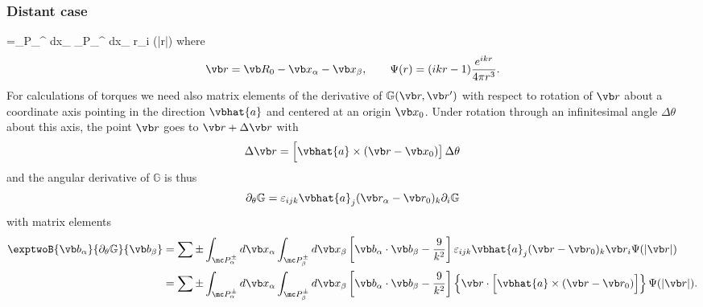 \documentclass[letterpaper]{article}
\begin{document}
\subsubsection*{Distant case}
{
 =\sum \pm \int_{\mc P_\alpha^\pm } d\vb x_\alpha
           \int_{\mc P_\beta^\pm  } d\vb x_\beta
           r_i \Psi(|\vb r|)
}
where
$$ \vb r = \vb R_0 - \vb x_\alpha - \vb x_\beta, \qquad
   \Psi(r) = (ikr-1)\frac{e^{ikr}}{4\pi r^3}.
$$
For calculations of torques we need also matrix elements
of the derivative of $\mathbb{G}(\vb r, \vb r^\prime)$ with respect
to rotation of $\vb r$ about a coordinate axis pointing in the 
direction $\vbhat{a}$ and centered at an origin $\vb x_0$. 
Under rotation through an infinitesimal angle $\Delta \theta$
about this axis, the point $\vb r$ goes to $\vb r + \Delta \vb r$
with 
$$\Delta \vb r = \Big[\vbhat{a}\times (\vb r-\vb x_0)\big] \, \Delta \theta$$
and the angular derivative of $\mathbb{G}$ is thus
$$
 \partial_\theta\mathbb{G}
 =
 \varepsilon_{ijk} \vbhat{a}_j (\vb r_\alpha - \vb r_0)_k \partial_i \mathbb{G}
$$
with matrix elements
\begin{align*}
 \exptwoB{\vb b_\alpha}{\partial_\theta \mathbb G}{\vb b_\beta}
&=\sum \pm \int_{\mc P_\alpha^\pm } d\vb x_\alpha
           \int_{\mc P_\beta^\pm  } d\vb x_\beta
           \left[ \vb b_\alpha \cdot \vb b_\beta
                 -\frac{9}{k^2}
           \right]
           \varepsilon_{ijk} \vbhat{a}_j(\vb r - \vb r_0)_k
           \vb r_i \Psi(|\vb r|)
\\
&=\sum \pm \int_{\mc P_\alpha^\pm } d\vb x_\alpha
           \int_{\mc P_\beta^\pm  } d\vb x_\beta
           \left[ \vb b_\alpha \cdot \vb b_\beta
                 -\frac{9}{k^2}
           \right]
           \left\{ \vb r \cdot \Big[\vbhat{a} \times (\vb r-\vb r_0)\Big]\right\}
           \Psi(|\vb r|).
\label{bdtGb}
\end{align*}
\end{document}
